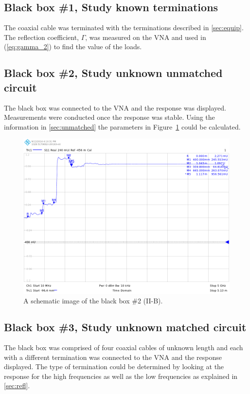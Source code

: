 \documentclass[12pt,a4paper]{article}
\begin{document}
\subsection{Black box \#1, Study known terminations}
The coaxial cable was terminated with the terminations described in \ref{sec:equip}. The reflection coefficient, $\Gamma$, was measured on the VNA and used in (\ref{eq:gamma_2}) to find the value of the loads.

\subsection{Black box \#2, Study unknown unmatched circuit}
The black box was connected to the VNA and the response was displayed. Measurements were conducted once the response was stable. Using the information in \ref{sec:unmatched} the parameters in Figure~\ref{fig:iib} could be calculated.

\begin{figure}[ht]
  \centering
  \includegraphics[width=\textwidth]{II-B_SVG.pdf}
  \caption{\label{fig:iib} A schematic image of the black box \#2 (II-B).}
\end{figure}

\subsection{Black box \#3, Study unknown matched circuit}
The black box was comprised of four coaxial cables of unknown length and each with a different termination was connected to the VNA and the response displayed. The type of termination could be determined by looking at the response for the high frequencies as well as the low frequencies as explained in \ref{sec:refl}.
\end{document}
